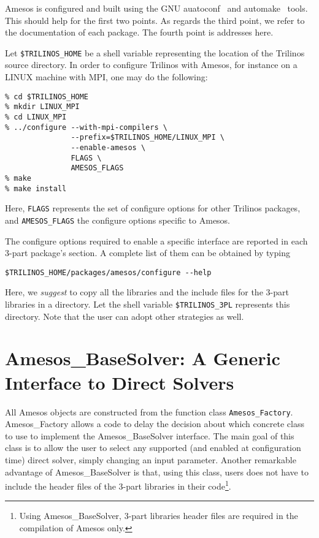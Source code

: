 \documentclass[11pt,letter]{article}
\begin{document}
Amesos is configured and built using the GNU auatoconf~\cite{Autoconf}
and automake~\cite{Automake} tools. This should help for the first two
points. As regards the third point, we refer to the documentation of
each package. The fourth point is addresses here.

Let \verb!$TRILINOS_HOME! be a shell variable representing the location
of the Trilinos source directory.  In order to configure Trilinos with
Amesos, for instance on a LINUX machine with MPI, one may do the following:
\begin{verbatim}
% cd $TRILINOS_HOME
% mkdir LINUX_MPI
% cd LINUX_MPI
% ../configure --with-mpi-compilers \
               --prefix=$TRILINOS_HOME/LINUX_MPI \
               --enable-amesos \
               FLAGS \
               AMESOS_FLAGS
% make
% make install
\end{verbatim}
Here, \verb!FLAGS! represents the set of configure options for other
Trilinos packages, and \verb!AMESOS_FLAGS! the configure options
specific to Amesos. 

The configure options required to enable a specific interface are
reported in each 3-part package's section. A complete list of them can
be obtained by typing
\begin{verbatim}
$TRILINOS_HOME/packages/amesos/configure --help
\end{verbatim}
Here, we {\sl suggest} to copy all the libraries and the include files
for the 3-part libraries in a directory. Let the shell variable
\verb!$TRILINOS_3PL! represents this directory. Note that the user can
adopt other strategies as well.


\section{Amesos\_BaseSolver: A Generic Interface to Direct Solvers}
\label{sec:amesos_generic}

All Amesos objects are constructed from the function class
\verb!Amesos_Factory!.  Amesos\_Factory allows a code to delay the
decision about which concrete class to use to implement the
Amesos\_BaseSolver interface. The main goal of this class is to allow
the user to select any supported (and enabled at configuration time)
direct solver, simply changing an input parameter. Another remarkable
advantage of Amesos\_BaseSolver is that, using this class, users does
not have to include the header files of the 3-part libraries in their
code\footnote{Using Amesos\_BaseSolver, 3-part libraries header files
  are required in the compilation of Amesos only.}.
\end{document}
